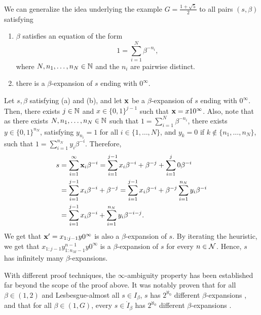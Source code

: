   We can generalize the idea underlying the example $G = \frac{1+\sqrt{5}}{2}$ to all pairs $(s,\beta)$ satisfying
  \begin{enumerate}[label = (\alph*)]
	\item $\beta$ satisfies an equation of the form 
	\begin{equation}
		1 = \sum_{i=1}^N \beta^{-n_i},
	\end{equation}
	where $N, n_1, \ldots, n_N \in \mathbb{N}$ and the $n_i$ are pairwise distinct.
	\item there is a $\beta$-expansion of $s$ ending with $0^\infty$.
  \end{enumerate}
  Let $s, \beta$ satisfying (a) and (b), and let ${\bf x}$ be a $\beta$-expansion of $s$ ending with $0^\infty$. Then, there exists $j \in \mathbb{N}$ and $x \in \{0,1\}^{j-1}$ such that ${\bf x} = x10^\infty$. Also, note that as there exists $N,n_1, \ldots,n_N \in \mathbb{N}$ such that $1 = \sum_{i=1}^N \beta^{-n_i}$, there exists $y \in \{0,1\}^{n_N}$, satisfying $y_{n_i} = 1$ for all $i \in \{1, \ldots, N\}$, and $y_k = 0$ if $k \notin \{n_1, \ldots, n_N\}$, such that $1 = \sum_{i=1}^{n_N} y_i \beta^{-i}$. Therefore,
  \begin{align}
	s &= \sum_{i=1}^\infty {\bf x}_i \beta^{-i} = \sum_{i=1}^{j-1} x_i \beta^{-i} + \beta^{-j} + \sum_{i=1}^j 0 \beta^{-i}\\
		&=\sum_{i=1}^{j-1} x_i \beta^{-i} + \beta^{-j} = \sum_{i=1}^{j-1} x_i \beta^{-i} + \beta^{-j} \sum_{i=1}^{n_N} y_i \beta^{-i}\\
		&=\sum_{i=1}^{j-1} x_i \beta^{-i} + \sum_{i=1}^{n_N} y_i \beta^{-i-j}.
  \end{align}
  We get that ${\bf x}' = x_{1:j-1}y0^\infty$ is also a $\beta$-expansion of $s$. By iterating the heuristic, we get that $x_{1:j-1}y_{1:n_M-1}^{n-1}y0^\infty$ is a $\beta$-expansion of $s$ for every $n \in \mathcal{N}$. Hence, $s$ has infinitely many $\beta$-expansions.

  With different proof techniques, the $\infty$-ambiguity property has been established far beyond the scope of the proof above. It was notably proven that for all $\beta \in (1,2)$ and Lesbesgue-almost all $s \in I_\beta$, $s$ has $2^{\aleph_0}$ different $\beta$-expansions \cite[Theorem 1]{sidorov2003almost}, and that for all $\beta \in (1,G)$, every $s \in \mathring I_\beta$ has $2^{\aleph_0}$ different $\beta$-expansions \cite[Theorem 3]{erdos1990characterization}.
  
